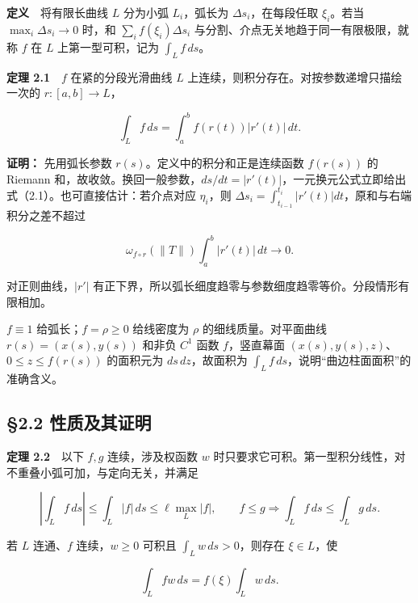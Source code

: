 \documentclass[11pt,a4paper]{article}
\begin{document}
\textbf{定义}　将有限长曲线 \(L\) 分为小弧 \(L_i\)，弧长为
\(\Delta s_i\)，在每段任取 \(\xi_i\)。若当 \(\max_i\Delta s_i\to0\)
时，和 \(\sum_i f(\xi_i)\Delta s_i\)
与分割、介点无关地趋于同一有限极限，就称 \(f\) 在 \(L\)
上第一型可积，记为 \(\int_Lf\,ds\)。

\textbf{定理 2.1}　\(f\) 在紧的分段光滑曲线 \(L\)
上连续，则积分存在。对按参数递增只描绘一次的 \(r:[a,b]\to L\)，

\begin{equation*}
 \int_Lf\,ds=\int_a^bf(r(t))|r'(t)|\,dt.\tag{2.1}
\end{equation*}

\textbf{证明：} 先用弧长参数 \(r(s)\)。定义中的积分和正是连续函数
\(f(r(s))\) 的 Riemann
和，故收敛。换回一般参数，\(ds/dt=|r'(t)|\)，一元换元公式立即给出式（2.1）。也可直接估计：若介点对应
\(\eta_i\)，则
\(\Delta s_i=\int_{t_{i-1}}^{t_i}|r'(t)|dt\)，原和与右端积分之差不超过

\begin{equation*}
 \omega_{f\circ r}(\|T\|)\int_a^b|r'(t)|\,dt\longrightarrow0.
\end{equation*}

对正则曲线，\(|r'|\)
有正下界，所以弧长细度趋零与参数细度趋零等价。分段情形有限相加。

\(f\equiv1\) 给弧长；\(f=\rho\ge0\) 给线密度为 \(\rho\)
的细线质量。对平面曲线 \(r(s)=(x(s),y(s))\) 和非负 \(C^1\) 函数
\(f\)，竖直幕面 \((x(s),y(s),z)\)、\(0\le z\le f(r(s))\) 的面积元为
\(ds\,dz\)，故面积为 \(\int_Lf\,ds\)，说明``曲边柱面面积''的准确含义。

\subsection{§2.2
性质及其证明}\label{ux6027ux8d28ux53caux5176ux8bc1ux660e}

\textbf{定理 2.2}　以下 \(f,g\) 连续，涉及权函数 \(w\)
时只要求它可积。第一型积分线性，对不重叠小弧可加，与定向无关，并满足

\begin{equation*}
 \left|\int_Lf\,ds\right|\le\int_L|f|\,ds
 \le\ell\max_L|f|,\qquad
 f\le g\Longrightarrow\int_Lf\,ds\le\int_Lg\,ds.\tag{2.2}
\end{equation*}

若 \(L\) 连通、\(f\) 连续，\(w\ge0\) 可积且 \(\int_Lw\,ds>0\)，则存在
\(\xi\in L\)，使

\begin{equation*}
 \int_Lfw\,ds=f(\xi)\int_Lw\,ds.\tag{2.3}
\end{equation*}
\end{document}
